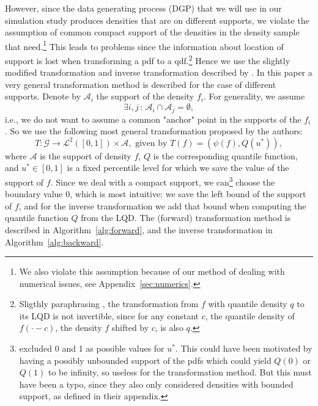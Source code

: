 However, since the data generating process (DGP) that we will use in our simulation study
produces densities that are on different supports, we violate the assumption of common
compact support of the densities in the density sample that \textcite{PetersenMüller2016}
need.\footnote{We also violate this assumption because of our method of dealing with
numerical issues, see Appendix~\ref{sec:numerics}.} This leads to problems since the information
about location of support is lost when transforming a pdf to a qdf.\footnote{Sligthly
paraphrasing \textcite{KokoszkaEtAl2019}, the transformation from $f$ with quantile
density $q$ to its LQD is not invertible, since for any constant $c$, the quantile density of
$f(\cdot - c)$, the density $f$ shifted by $c$, is also $q$.}
Hence we use the slightly modified transformation and inverse transformation described
by \textcite{KokoszkaEtAl2019}. In this paper a very general transformation method is
described for the case of different supports. Denote by $\mathcal{A}_i$ the support of
the density $f_i$. For generality, we assume
\begin{equation*}
    \exists i, j \, : \, \mathcal{A}_i \cap \mathcal{A}_j = \emptyset,
\end{equation*}
i.e., we do not want to assume a common "anchor" point in the supports of the $f_i$. So
we use the following most general transformation proposed by the authors:
\begin{equation}
    T : \mathcal{G} \to \mathcal{L}^2([0,1]) \times \mathcal{A}, \text{ given by } T(f) = (\psi(f), Q(u^*)),
\end{equation}
where $\mathcal{A}$ is the support of density $f$, $Q$ is the corresponding quantile function,
and $u^* \in [0,1]$ is a fixed percentile level for which we save the value of the support
of $f$. Since we deal with a compact support, we can\footnote{\textcite{KokoszkaEtAl2019}
excluded 0 and 1 as possible values for $u^*$. This could have been motivated by having
a possibly unbounded support of the pdfs which could yield $Q(0)$ or $Q(1)$ to be
infinity, so useless for the transformation method. But this must have been a typo,
since they also only considered densities with bounded support, as defined in their
appendix.} choose the boundary value 0, which is most intuitive: we save the left bound
of the support of $f$, and for the inverse transformation we add that bound when computing
the quantile function $Q$ from the LQD. The (forward) transformation method is described
in Algorithm~\ref{alg:forward}, and the inverse transformation in Algorithm~\ref{alg:backward}.

